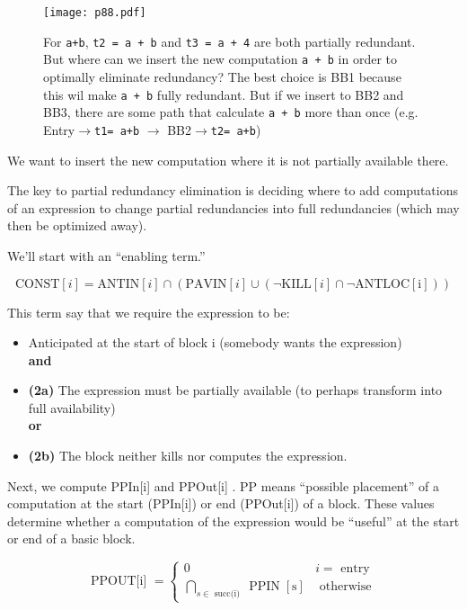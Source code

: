 \begin{figure}[H]
    \centering
     \texttt{[image: p88.pdf]}
         \caption{For \texttt{a+b}, \texttt{t2 = a + b} and \texttt{t3 = a + 4} are both partially redundant. But where can we insert the new computation \texttt{a + b} in order to optimally eliminate redundancy?
         The best choice is BB1 because this wil  make \texttt{a + b} fully redundant. But if we insert to BB2 and BB3, there are some path that calculate \texttt{a + b} more than once (e.g. Entry$\rightarrow$\texttt{t1= a+b} $\rightarrow$ BB2$\rightarrow$\texttt{t2= a+b}) }
         \label{fig:p88}
\end{figure}

We want to insert the new computation where it is not partially available there.


The key to partial redundancy
elimination is deciding where to add
computations of an expression to
change partial redundancies into full
redundancies (which may then be
optimized away).

We’ll start with an “enabling term.”

\[
    \mathrm{CONST}[i] = \mathrm{ANTIN}[i] \cap ( \mathrm{PAVIN}[i] \cup ( \neg \mathrm{KILL}[i] \cap \neg \mathrm{ANTLOC[i]}  ))
\]


This term say that we require the
expression to be:

\begin{itemize}
    \item  Anticipated at the start of block i (somebody wants the expression) \\
    {\large \textbf{and}} 
    
        \item {\large \textbf{(2a)}}  The expression must be partially
        available (to perhaps transform
        into full availability)\\
        {\large \textbf{or}} 
        \item {\large \textbf{(2b)}} The block neither kills nor
        computes the expression.
   
\end{itemize}

Next, we compute PPIn[i] and PPOut[i]
.
PP means “possible placement” of a computation at the start (PPIn[i]) or
end (PPOut[i]) of a block. These values determine whether a
computation of the expression would
be “useful” at the start or end of a
basic block.


$$
\text { PPOUT[i] }=\left\{\begin{array}{cl}
0 & i=\text { entry } \\
\bigcap_{s \in \text { succ(i) }} \operatorname{PPIN}[\mathrm{s}] & \text { otherwise }
\end{array}\right.
$$

